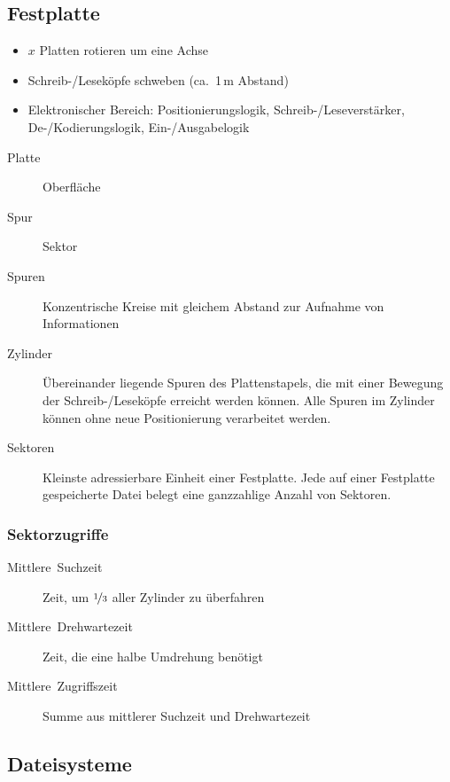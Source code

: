 \subsection{Festplatte}
\begin{itemize}
  \item {}
	$x$ Platten rotieren um eine Achse
  \item {}
	Schreib-/Leseköpfe schweben (ca.~1\,\textmu{}m Abstand)
  \item {}
	Elektronischer Bereich: Positionierungslogik, Schreib-/Leseverstärker, De-/Kodierungslogik, Ein-/Ausgabelogik
\end{itemize}
\begin{description}
  \item [{Platte}] 
	Oberfläche
  \item [{Spur}] 
	Sektor
  \item [{Spuren}]
	Konzentrische Kreise mit gleichem Abstand zur Aufnahme von Informationen
  \item [{Zylinder}] 
	Übereinander liegende Spuren des Plattenstapels, die mit einer Bewegung der Schreib-/Leseköpfe erreicht werden können.
	Alle Spuren im Zylinder können ohne neue Positionierung verarbeitet werden.
  \item [{Sektoren}]
	Kleinste adressierbare Einheit einer Festplatte. Jede auf einer Festplatte gespeicherte Datei belegt eine ganzzahlige Anzahl von Sektoren.
\end{description}

\subsubsection{Sektorzugriffe}
\begin{description}
  \item [{Mittlere~Suchzeit}] 
	Zeit, um $\nicefrac{1}{3}$ aller Zylinder zu überfahren
  \item [{Mittlere~Drehwartezeit}] 
	Zeit, die eine halbe Umdrehung benötigt
  \item [{Mittlere~Zugriffszeit}] 
	Summe aus mittlerer Suchzeit und Drehwartezeit
\end{description}

\subsection{Dateisysteme}

